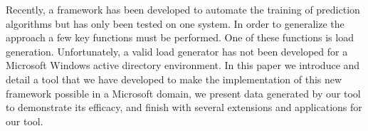 %
Recently, a framework has been developed to automate the training of prediction
algorithms but has only been tested on one system.  In order to generalize the
approach a few key functions must be performed.  One of these functions is load
generation.  Unfortunately, a valid load generator has not been developed for a
Microsoft Windows active directory environment.  In this paper we introduce and
detail a tool that we have developed to make the implementation of this new
framework possible in a Microsoft domain, we present data generated by our tool
to demonstrate its efficacy, and finish with several extensions and
applications for our tool.
